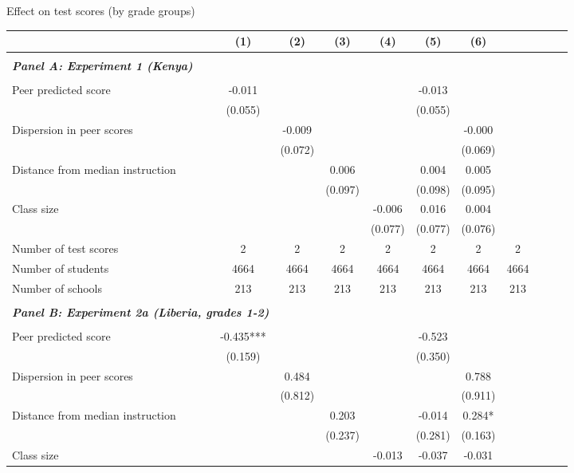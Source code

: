 \begin{center} 
\caption{\small Effect on test scores (by grade groups)} 
\label{tab:descriptives} 
\begin{scriptsize}
\begin{threeparttable}
\begin{tabular} {@{} l l c c c c c c c c c c  @{}} \toprule \toprule
& &(1)&(2)&(3)&(4)&(5)&(6) \\ \midrule 
\\
\multicolumn{3}{l}{\textbf{\textit{Panel A: Experiment 1 (Kenya)}}} \\
\\
Peer predicted score &  & -0.011 &  &  &  & -0.013 &  \\
                 &  & (0.055) &  &  &  & (0.055) &  \\
Dispersion in peer scores &  &  & -0.009 &  &  &  & -0.000 \\
                 &  &  & (0.072) &  &  &  & (0.069) \\
Distance from median instruction &  &  &  & 0.006 &  & 0.004 & 0.005 \\
                 &  &  &  & (0.097) &  & (0.098) & (0.095) \\
Class size &  &  &  &  & -0.006 & 0.016 & 0.004 \\
                 &  &  &  &  & (0.077) & (0.077) & (0.076) \\
\midrule
Number of test scores &  & 2 & 2 & 2 & 2 & 2 & 2 & 2 \\
Number of students &  & 4664 & 4664 & 4664 & 4664 & 4664 & 4664 & 4664 \\
Number of schools &  & 213 & 213 & 213 & 213 & 213 & 213 & 213 \\
 \midrule
\\
\multicolumn{3}{l}{\textbf{\textit{Panel B: Experiment 2a (Liberia, grades 1-2)}}} \\
\\
Peer predicted score &  & -0.435*** &  &  &  & -0.523 &  \\
                 &  & (0.159) &  &  &  & (0.350) &  \\
Dispersion in peer scores &  &  & 0.484 &  &  &  & 0.788 \\
                 &  &  & (0.812) &  &  &  & (0.911) \\
Distance from median instruction &  &  &  & 0.203 &  & -0.014 & 0.284* \\
                 &  &  &  & (0.237) &  & (0.281) & (0.163) \\
Class size &  &  &  &  & -0.013 & -0.037 & -0.031 \\

\end{tabular}
\end{threeparttable}
\end{scriptsize}
\end{center}
